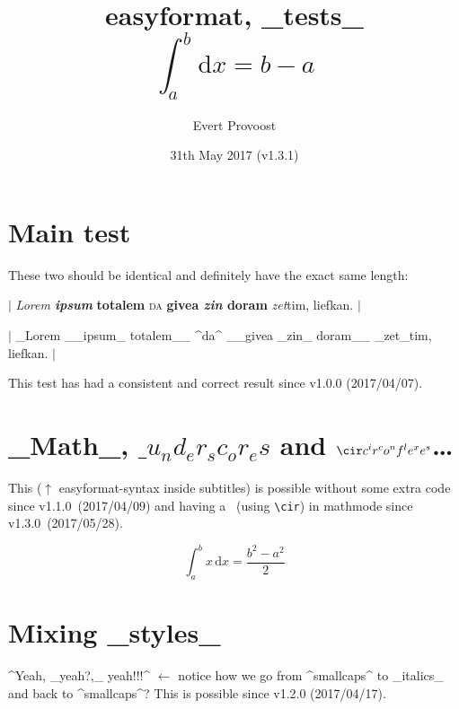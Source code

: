 \documentclass[11pt]{article}
\title{\textsf{easyformat}, _tests_\\$$ \int_a^b \mathrm{d}x = b - a $$}
\author{Evert Provoost}
\date{31th May 2017 (v1.3.1)}
\begin{document}
	\enableeasyformat %

	\maketitle
	\tableofcontents
	\vspace{2em}

	\section{Main test}
	These two should be identical and definitely have the exact same length:

	$|$ \textit{Lorem \textbf{ipsum}}\textbf{ totalem} \textsc{da} \textbf{givea \textit{zin} doram} \textit{zet}tim, liefkan. $|$

	$|$ _Lorem __ipsum_ totalem__ ^da^ __givea _zin_ doram__ _zet_tim, liefkan. $|$
	
	\noindent This test has had a consistent and correct result since v1.0.0 (2017/04/07).

	\section{_Math_, $\_ u_nd_er_sc_or_es$ and $\cir c^ir^co^nf^le^xe^s$\dots}
	This ($\uparrow$ \textsf{easyformat}-syntax inside subtitles) is possible without some extra code since v1.1.0~(2017/04/09) and having a \cir\ (using \verb|\cir|) in mathmode since v1.3.0~(2017/05/28).
	
	$$ \int_a^b x\,\mathrm{d}x = \frac{b^2 - a^2}{2} $$
	
	\section{Mixing _styles_}
	^Yeah, _yeah?,_ yeah!!!^
	$\leftarrow$ notice how we go from ^smallcaps^ to _italics_ and back to ^smallcaps^? This is possible since v1.2.0 (2017/04/17).
\end{document}

